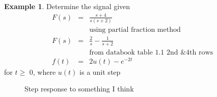 \documentclass[11pt]{article} %
\theoremstyle{definition}
\newtheorem{example}{Example}[subsection]
\begin{document}
\begin{example}
	Determine the signal given
		\begin{eqnarray}
			F(s) &=& \frac{s+4}{s(s+2)} \nonumber \\
			&&\mbox{using partial fraction method} \nonumber \\
			F(s) &=& \frac{2}{s} - \frac{1}{s+2} \nonumber \\
			&&\mbox{from databook table 1.1 2nd \& 4th rows} \nonumber \\
			f(t)&=&2u(t)-e^{-2t}
		\end{eqnarray}
		for $t\ge$ 0, where $u(t)$ is a unit step

	\begin{figure}[h]
		\centering
		\caption{Step response to something I think}
	\end{figure}
\end{example}
\end{document}
